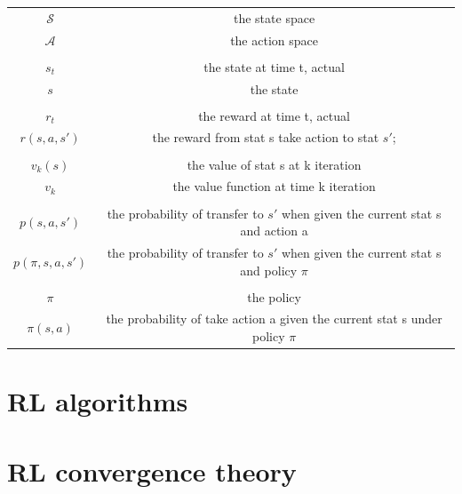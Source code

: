 \documentclass[10pt,a4paper]{article}
\theoremstyle{definition}
\theoremstyle{remark}
\begin{document}
	\begin{center}
		\begin{tabular}{ |c  c| } 
			\hline
			$ \mathcal{S} $ &    the state space \\ 
			$ \mathcal{A} $& the action space\\
			&\\
		
			$ s_t $ &    the state at time t, actual  \\ 
			$ s $ & the state\\
			&\\
			
		
			$ r_t $ & the reward at time t, actual\\
			$ r(s,a,s') $ & the reward from stat s take action to stat $s'$;\\
			&\\
			$ v_k(s) $ & the value of stat s at k iteration\\ 
			$ v_k $ & the value function at time k iteration\\
			
			&\\
			$p(s,a,s')$& the probability of transfer to $s'$ when given the current stat s and action a\\
				
			$p(\pi,s,a,s')$&the probability of transfer to $s'$ when given the current stat s and policy $\pi$\\	
			
			&\\
			
			$\pi$& the policy\\
			$\pi(s,a)$& the probability of take action a given the current stat s under policy $\pi$\\
			
			
			\hline
		\end{tabular}
	\end{center}
	
	
	
	
	
	
	\section{RL algorithms}
	\label{algorithms}
	
	\section{RL convergence theory}
	\label{convergence}
	
\end{document}
